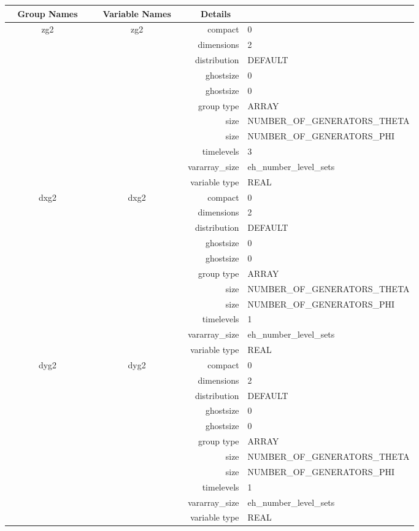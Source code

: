 \begin{tabular*}{150mm}{|c|c@{\extracolsep{\fill}}|rl|} \hline 
~ {\bf Group Names} ~ & ~ {\bf Variable Names} ~  &{\bf Details} ~ & ~ \\ 
\hline 
zg2 & zg2 & compact & 0 \\ 
 &  & dimensions & 2 \\ 
 &  & distribution & DEFAULT \\ 
 &  & ghostsize & 0 \\ 
& ~ & ghostsize & 0 \\ 
 &  & group type & ARRAY \\ 
 &  & size & NUMBER\_OF\_GENERATORS\_THETA \\ 
& ~ & size & NUMBER\_OF\_GENERATORS\_PHI \\ 
 &  & timelevels & 3 \\ 
 &  & vararray\_size & eh\_number\_level\_sets \\ 
 &  & variable type & REAL \\ 
\hline 
dxg2 & dxg2 & compact & 0 \\ 
 &  & dimensions & 2 \\ 
 &  & distribution & DEFAULT \\ 
 &  & ghostsize & 0 \\ 
& ~ & ghostsize & 0 \\ 
 &  & group type & ARRAY \\ 
 &  & size & NUMBER\_OF\_GENERATORS\_THETA \\ 
& ~ & size & NUMBER\_OF\_GENERATORS\_PHI \\ 
 &  & timelevels & 1 \\ 
 &  & vararray\_size & eh\_number\_level\_sets \\ 
 &  & variable type & REAL \\ 
\hline 
dyg2 & dyg2 & compact & 0 \\ 
 &  & dimensions & 2 \\ 
 &  & distribution & DEFAULT \\ 
 &  & ghostsize & 0 \\ 
& ~ & ghostsize & 0 \\ 
 &  & group type & ARRAY \\ 
 &  & size & NUMBER\_OF\_GENERATORS\_THETA \\ 
& ~ & size & NUMBER\_OF\_GENERATORS\_PHI \\ 
 &  & timelevels & 1 \\ 
 &  & vararray\_size & eh\_number\_level\_sets \\ 
 &  & variable type & REAL \\ 

\end{tabular*}
